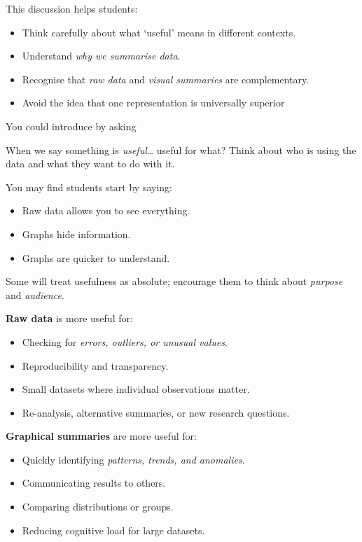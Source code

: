 \documentclass[
  11pt,
  a4paper,
  krantz2]{krantz}
\makeatletter
\providecommand{\tightlist}{%
  \setlength{\itemsep}{0pt}\setlength{\parskip}{0pt}}
\renewenvironment{quote}%
{\begin{kframe}}
{\end{kframe}}
\newenvironment{kframe}{%
\medskip{}
\setlength{\fboxsep}{.8em}
 \def\at@end@of@kframe{}%
 \ifinner\ifhmode%
  \def\at@end@of@kframe{\end{minipage}}%
  \begin{minipage}{\columnwidth}%
 \fi\fi%
 \def\FrameCommand##1{\hskip\@totalleftmargin \hskip-\fboxsep
 \colorbox{shadecolor}{##1}\hskip-\fboxsep
     \hskip-\linewidth \hskip-\@totalleftmargin \hskip\columnwidth}%
 \MakeFramed {\advance\hsize-\width
   \@totalleftmargin\z@ \linewidth\hsize
   \@setminipage}}%
 {\par\unskip\endMakeFramed%
 \at@end@of@kframe}
\renewenvironment{quote}
               {\list{}{\vspace{-0.5em}\begin{kframe}\small%
                        \rightmargin   \leftmargin
                        \parsep        \z@ \@plus\p@}%
                \item\relax}
               {\end{kframe}\endlist}
\makeatother
\begin{document}
This discussion helps students:

\begin{itemize}
\tightlist
\item
  Think carefully about what `useful' means in different contexts.
\item
  Understand \emph{why we summarise data}.
\item
  Recognise that \emph{raw data} and \emph{visual summaries} are complementary.
\item
  Avoid the idea that one representation is universally superior
\end{itemize}

You could introduce by asking

\begin{quote}
When we say something is \emph{useful}\ldots{} useful for what?
Think about who is using the data and what they want to do with it.
\end{quote}

You may find students start by saying:

\begin{itemize}
\tightlist
\item
  Raw data allows you to see everything.
\item
  Graphs hide information.
\item
  Graphs are quicker to understand.
\end{itemize}

Some will treat usefulness as absolute; encourage them to think about \emph{purpose} and \emph{audience}.

\textbf{Raw data} is more useful for:

\begin{itemize}
\tightlist
\item
  Checking for \emph{errors, outliers, or unusual values}.
\item
  Reproducibility and transparency.
\item
  Small datasets where individual observations matter.
\item
  Re-analysis, alternative summaries, or new research questions.
\end{itemize}

\textbf{Graphical summaries} are more useful for:

\begin{itemize}
\tightlist
\item
  Quickly identifying \emph{patterns, trends, and anomalies}.
\item
  Communicating results to others.
\item
  Comparing distributions or groups.
\item
  Reducing cognitive load for large datasets.
\end{itemize}
\end{document}
